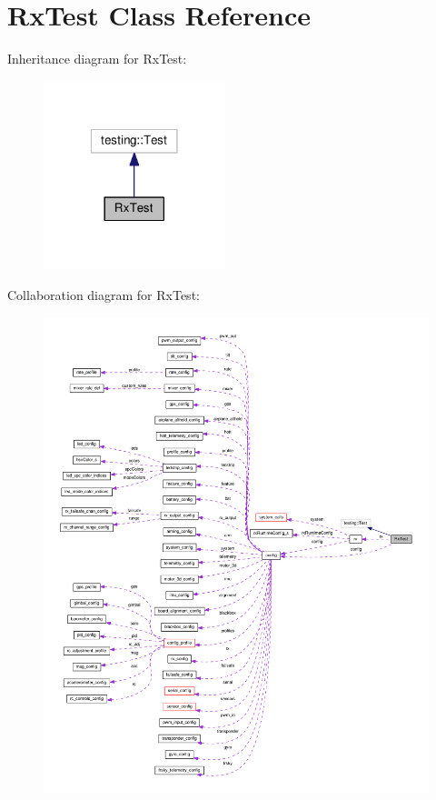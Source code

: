 \hypertarget{classRxTest}{\section{Rx\+Test Class Reference}
\label{classRxTest}
}


Inheritance diagram for Rx\+Test\+:\nopagebreak
\begin{figure}[H]
\begin{center}
\leavevmode
\includegraphics[width=150pt]{classRxTest__inherit__graph}
\end{center}
\end{figure}


Collaboration diagram for Rx\+Test\+:\nopagebreak
\begin{figure}[H]
\begin{center}
\leavevmode
\includegraphics[width=350pt]{classRxTest__coll__graph}
\end{center}
\end{figure}

